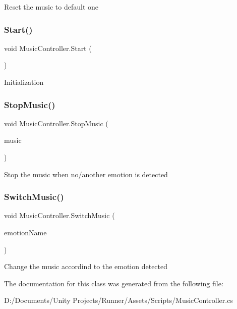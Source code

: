 Reset the music to default one \mbox{\label{class_music_controller_a262af298ee2c96b1f04d4f8a2ae58ef9}} 
\subsubsection{\texorpdfstring{Start()}{Start()}}
{\footnotesize\ttfamily void Music\+Controller.\+Start (\begin{DoxyParamCaption}{ }\end{DoxyParamCaption})\hspace{0.3cm}{\ttfamily [private]}}

Initialization \mbox{\label{class_music_controller_ad34d18199b46d787b0fd54942602dbef}} 
\subsubsection{\texorpdfstring{Stop\+Music()}{StopMusic()}}
{\footnotesize\ttfamily void Music\+Controller.\+Stop\+Music (\begin{DoxyParamCaption}\item[{Audio\+Source}]{music }\end{DoxyParamCaption})\hspace{0.3cm}{\ttfamily [private]}}

Stop the music when no/another emotion is detected \mbox{\label{class_music_controller_a59a194df4e895834b0639bd6c750a7b9}} 
\subsubsection{\texorpdfstring{Switch\+Music()}{SwitchMusic()}}
{\footnotesize\ttfamily void Music\+Controller.\+Switch\+Music (\begin{DoxyParamCaption}\item[{string}]{emotion\+Name }\end{DoxyParamCaption})}

Change the music accordind to the emotion detected 

The documentation for this class was generated from the following file\+:\begin{DoxyCompactItemize}
\item 
D\+:/\+Documents/\+Unity Projects/\+Runner/\+Assets/\+Scripts/Music\+Controller.\+cs\end{DoxyCompactItemize}
